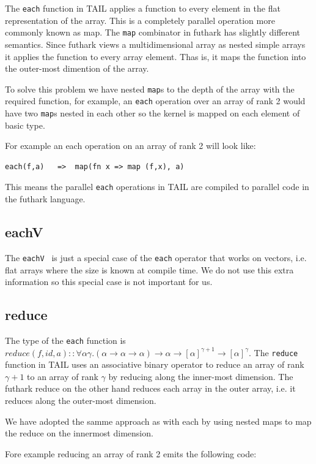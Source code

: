 \documentclass[11pt]{article}
\begin{document}
The {\tt each} function in TAIL applies a function to every element in the flat representation of the array. This is a completely parallel operation more commonly known as map. The {\tt map} combinator in futhark has slightly different semantics.
Since futhark views a multidimensional array as nested simple arrays it applies the function to every array element.
Thas is, it maps the function into the outer-most dimention of the array.

To solve this problem we have nested {\tt map}s to the depth of the array with the required function, for example, an {\tt each} operation over an array of rank 2 would have two {\tt map}s nested in each other so the kernel is mapped on each element of basic type.

For example an each operation on an array of rank 2 will look like:
\begin{lstlisting}[numbers=none,frame=none]
each(f,a)	=>	map(fn x => map (f,x), a)
\end{lstlisting}

This means the parallel {\tt each} operations in TAIL are compiled to parallel code in the futhark language.

\subsection{eachV}
The {\tt eachV } is just a special case of the {\tt each} operator that works on vectors, i.e. flat arrays where the size
is known at compile time. We do not use this extra information so this special case is not important for us.

\subsection{reduce}
The type of the {\tt each} function is $reduce(f,id,a) :: \forall\alpha\gamma.(\alpha \to \alpha \to \alpha) \to \alpha \to [\alpha]^{\gamma+1} \to [\alpha]^\gamma$.
The {\tt reduce} function in TAIL uses an associative binary operator to reduce an array of rank $\gamma+1$ to an array of rank $\gamma$ by reducing along the inner-most dimension. The futhark reduce on the other hand reduces each array in the outer array, i.e. it reduces along the outer-most dimension. 

We have adopted the samme approach as with each by using nested maps to map the reduce on the innermost dimension.

Fore example reducing an array of rank 2 emits the following code:
\end{document}
